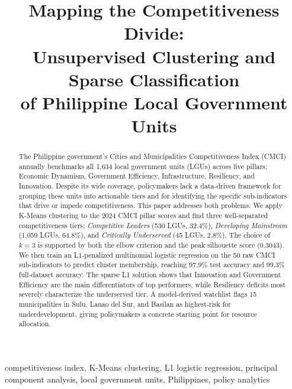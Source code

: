 \documentclass[conference]{IEEEtran}
\begin{document}
\title{Mapping the Competitiveness Divide:\\
Unsupervised Clustering and Sparse Classification\\
of Philippine Local Government Units}

\author{
}

\maketitle

\begin{abstract}
The Philippine government's Cities and Municipalities Competitiveness Index (CMCI) annually benchmarks all 1,634 local government units (LGUs) across five pillars: Economic Dynamism, Government Efficiency, Infrastructure, Resiliency, and Innovation. Despite its wide coverage, policymakers lack a data-driven framework for grouping these units into actionable tiers and for identifying the specific sub-indicators that drive or impede competitiveness. This paper addresses both problems. We apply K-Means clustering to the 2024 CMCI pillar scores and find three well-separated competitiveness tiers: \textit{Competitive Leaders} (530 LGUs, 32.4\%), \textit{Developing Mainstream} (1,059 LGUs, 64.8\%), and \textit{Critically Underserved} (45 LGUs, 2.8\%). The choice of $k{=}3$ is supported by both the elbow criterion and the peak silhouette score (0.3043). We then train an L1-penalized multinomial logistic regression on the 50 raw CMCI sub-indicators to predict cluster membership, reaching 97.9\% test accuracy and 99.3\% full-dataset accuracy. The sparse L1 solution shows that Innovation and Government Efficiency are the main differentiators of top performers, while Resiliency deficits most severely characterize the underserved tier. A model-derived watchlist flags 15 municipalities in Sulu, Lanao del Sur, and Basilan as highest-risk for underdevelopment, giving policymakers a concrete starting point for resource allocation.
\end{abstract}

\begin{IEEEkeywords}
competitiveness index, K-Means clustering, L1 logistic regression, principal component analysis, local government units, Philippines, policy analytics
\end{IEEEkeywords}
\end{document}
